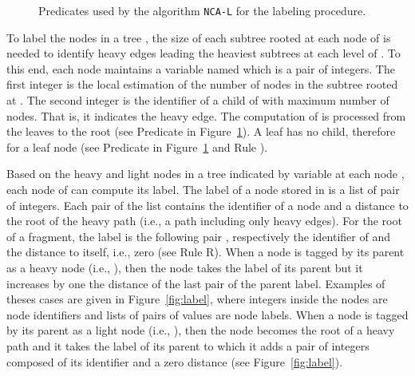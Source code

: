 \documentclass[11pt,a4paper]{article}
\newcommand{\RRoot}{\mbox{\rm R}} 	\newcommand{\RRLC}{\mbox{\rm R}}\newcommand{\RLC}{\mbox{\rm R}} \newcommand{\RMin}{\mbox{\rm R}}
\newcommand{\LabA}{\mbox{\tt NCA-L}}
\begin{document}
\begin{figure}[ht]
\fbox{
\begin{minipage}{15cm}
\begin{description}
\item[-] 
\item[-] 
\item[-] 
\item[-] 	
\item[-] 
\item[-] 
\item[-] 
\item[-] \\
\item[-] 
\item[-] 
\item[-] 
\end{description}
\end{minipage}
}
\caption{Predicates used by the algorithm \LabA\/ for the labeling procedure.}
\label{fig:predicates1}
\end{figure}

To label the nodes in a tree , the size of each subtree rooted at each node of  is needed to identify heavy edges leading the heaviest subtrees at each level of .
To this end, each node  maintains 
a variable named  which is a pair of integers. 
The first integer is the local 
estimation of the number of nodes in the subtree rooted at . 
The second integer is the identifier of a child of  with 
maximum number of nodes.  That is, it indicates the heavy edge.
The computation of  is processed from the leaves to the root 
(see  Predicate  in Figure~\ref{fig:predicates1}).
A leaf has no child, therefore  for a leaf node  (see Predicate  in 
Figure~\ref{fig:predicates1} and Rule ).


Based on the heavy and light nodes in a tree  indicated by variable  at each node , each node of  can compute its label.
The label of a node  stored in  is a list of pair of integers.
Each pair of the list contains the identifier of a node and a distance to the root of the heavy path (i.e., a path including only heavy edges).
For the root  of a fragment, the label  is the following pair , respectively the identifier of  and the distance to itself, i.e., zero (see Rule \RRoot\/).
When a node  is tagged by its parent as a heavy node (i.e., ), then the node  takes the label of its parent but 
it increases by one the distance of the last pair of the parent label.
Examples of theses cases are given in Figure~\ref{fig:label}, where integers inside the nodes are node identifiers and lists of pairs of values are node labels.
When a node  is tagged by its parent  as a light node (i.e., ), then the node  becomes the root of a heavy path and it takes the label of its parent to which it adds a pair of integers composed of its identifier and a zero distance (see Figure~\ref{fig:label}). 
\end{document}

